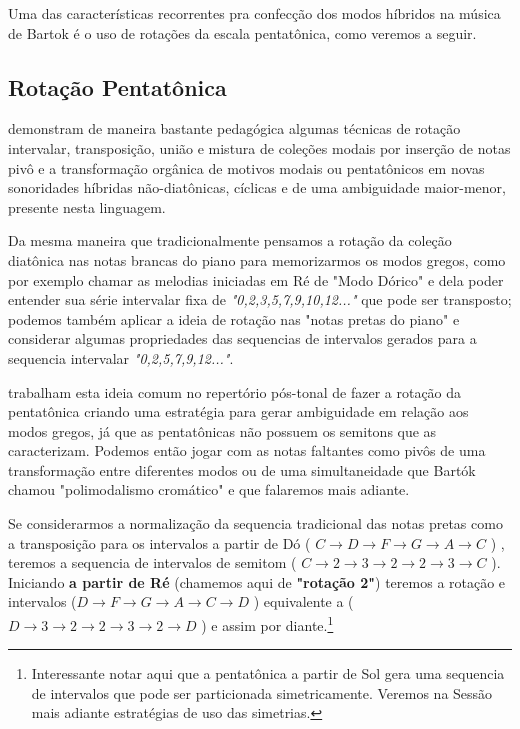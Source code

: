 \documentclass[
	12pt,				%
	openright,			%
	twoside,			%
	a4paper,			%
	english,			%
	french,				%
	spanish,			%
	brazil				%
	]{abntex2}
\begin{document}
Uma das características recorrentes pra confecção dos modos híbridos na música de Bartok é o uso de rotações da escala pentatônica, como veremos a seguir.


\subsection{Rotação Pentatônica}
 
 demonstram de maneira bastante pedagógica algumas técnicas de rotação intervalar, transposição, união e mistura de coleções modais por inserção de notas pivô e a transformação orgânica de motivos modais ou pentatônicos em novas sonoridades híbridas não-diatônicas, cíclicas e de uma ambiguidade maior-menor, presente nesta linguagem. 

Da mesma maneira que tradicionalmente pensamos a rotação da coleção diatônica nas notas brancas do piano para memorizarmos os modos gregos, como por exemplo chamar as melodias iniciadas em Ré de "Modo Dórico" e dela poder entender sua série intervalar fixa de \textit{"0,2,3,5,7,9,10,12..."} que pode ser transposto; podemos também aplicar a ideia de rotação nas "notas pretas do piano" e considerar algumas propriedades das sequencias de intervalos gerados para a sequencia intervalar \textit{"0,2,5,7,9,12..."}.

 trabalham esta ideia comum no repertório pós-tonal de fazer a rotação da pentatônica criando uma estratégia para gerar ambiguidade em relação aos modos gregos, já que as pentatônicas não possuem os semitons que as caracterizam. Podemos então jogar com as notas faltantes como pivôs de uma transformação entre diferentes modos ou de uma simultaneidade que Bartók chamou "polimodalismo cromático" e que falaremos mais adiante. 

Se considerarmos a normalização da sequencia tradicional das notas pretas como a transposição para os intervalos a partir de Dó ( $C \rightarrow  D \rightarrow F \rightarrow G \rightarrow A \rightarrow C $ ) , teremos a sequencia de intervalos de semitom ( $C \rightarrow 2 \rightarrow  3 \rightarrow 2 \rightarrow 2  \rightarrow 3 \rightarrow C $ ). Iniciando \textbf{a partir de Ré} (chamemos aqui de \textbf{"rotação 2"}) teremos a rotação e intervalos ($D \rightarrow F \rightarrow G \rightarrow A \rightarrow C \rightarrow D $ ) equivalente a ( $  D \rightarrow 3 \rightarrow  2 \rightarrow 2 \rightarrow 3  \rightarrow 2 \rightarrow D $ ) e assim por diante.\footnote{Interessante notar aqui que a pentatônica a partir de Sol gera uma sequencia de intervalos que pode ser particionada simetricamente. Veremos na Sessão mais adiante estratégias de uso das simetrias.}
\end{document}
